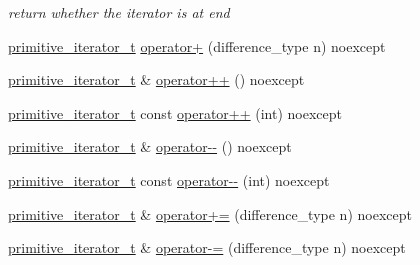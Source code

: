 \begin{DoxyCompactItemize}
\begin{DoxyCompactList}\small\item\em return whether the iterator is at end \end{DoxyCompactList}\item 
\mbox{\hyperlink{classnlohmann_1_1detail_1_1primitive__iterator__t}{primitive\+\_\+iterator\+\_\+t}} \mbox{\hyperlink{classnlohmann_1_1detail_1_1primitive__iterator__t_a00ce828d0fe58046c10e0445504df7bf}{operator+}} (difference\+\_\+type n) noexcept
\item 
\mbox{\hyperlink{classnlohmann_1_1detail_1_1primitive__iterator__t}{primitive\+\_\+iterator\+\_\+t}} \& \mbox{\hyperlink{classnlohmann_1_1detail_1_1primitive__iterator__t_ad26511012fc88f3ec5d9e1cb708732fd}{operator++}} () noexcept
\item 
\mbox{\hyperlink{classnlohmann_1_1detail_1_1primitive__iterator__t}{primitive\+\_\+iterator\+\_\+t}} const \mbox{\hyperlink{classnlohmann_1_1detail_1_1primitive__iterator__t_aa011863621357b3cf891670bf63a48b1}{operator++}} (int) noexcept
\item 
\mbox{\hyperlink{classnlohmann_1_1detail_1_1primitive__iterator__t}{primitive\+\_\+iterator\+\_\+t}} \& \mbox{\hyperlink{classnlohmann_1_1detail_1_1primitive__iterator__t_abecbf0c73c7fe963a699738065177bc3}{operator-\/-\/}} () noexcept
\item 
\mbox{\hyperlink{classnlohmann_1_1detail_1_1primitive__iterator__t}{primitive\+\_\+iterator\+\_\+t}} const \mbox{\hyperlink{classnlohmann_1_1detail_1_1primitive__iterator__t_aef3b5dfeb2cb04dc9d0a024fc1898b98}{operator-\/-\/}} (int) noexcept
\item 
\mbox{\hyperlink{classnlohmann_1_1detail_1_1primitive__iterator__t}{primitive\+\_\+iterator\+\_\+t}} \& \mbox{\hyperlink{classnlohmann_1_1detail_1_1primitive__iterator__t_aee01535df0b3b40137d9241029a9a203}{operator+=}} (difference\+\_\+type n) noexcept
\item 
\mbox{\hyperlink{classnlohmann_1_1detail_1_1primitive__iterator__t}{primitive\+\_\+iterator\+\_\+t}} \& \mbox{\hyperlink{classnlohmann_1_1detail_1_1primitive__iterator__t_a0bf83ab08abe1ae4b51c790c85cdf151}{operator-\/=}} (difference\+\_\+type n) noexcept
\end{DoxyCompactItemize}
